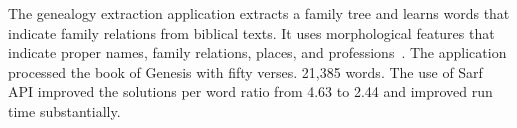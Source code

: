 The genealogy extraction application extracts a family tree and learns words
that indicate family relations from biblical texts.
It uses morphological features that indicate proper names, family relations, places, 
and professions~\citep{ZaMaHaCicling2012Entity}. 
The application processed the book of Genesis with fifty verses. 
21,385 words. 
The use of Sarf API improved the solutions per word ratio from 4.63 to 2.44 and improved run time substantially. 



%
%
%
%

